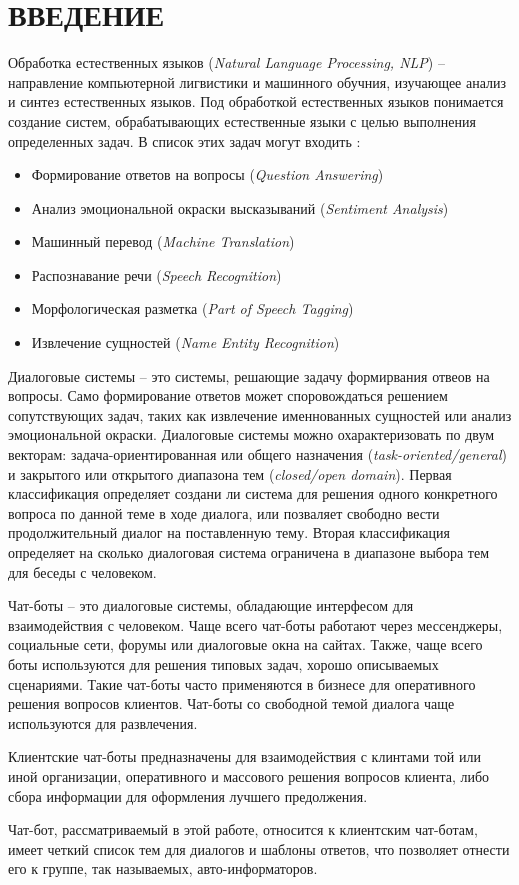 \section*{ВВЕДЕНИЕ}
Обработка естественных языков (\textit{Natural Language Processing, NLP})
-- направление компьютерной лигвистики и машинного обучния,
изучающее анализ и синтез естественных языков.
Под обработкой естественных языков  понимается создание систем,
обрабатывающих естественные языки с целью выполнения определенных задач.
В список этих задач могут входить \cite{cursera.nlp}:
\begin{itemize}
    \item Формирование ответов на вопросы (\textit{Question Answering})
    \item Анализ эмоциональной окраски высказываний (\textit{Sentiment Analysis})
    \item Машинный перевод (\textit{Machine Translation})
    \item Распознавание речи (\textit{Speech Recognition})
    \item Морфологическая разметка (\textit{Part of Speech Tagging})
    \item Извлечение сущностей (\textit{Name Entity Recognition})
\end{itemize}

Диалоговые системы -- это системы, решающие задачу формирвания отвеов на вопросы.
Само формирование ответов может споровождаться решением сопутствующих задач, таких как
извлечение именнованных сущностей или анализ эмоциональной окраски.
Диалоговые системы можно охарактеризовать по двум векторам:
задача-ориентированная или общего назначения (\textit{task-oriented/general})
и закрытого или открытого диапазона тем (\textit{closed/open domain}).
Первая классификация определяет создани ли система для решения одного конкретного
вопроса по данной теме в ходе диалога, или позваляет свободно вести продолжительный
диалог на поставленную тему.
Вторая классификация определяет на сколько диалоговая система ограничена в диапазоне выбора тем
для беседы с человеком.

Чат-боты -- это диалоговые системы, обладающие интерфесом для взаимодействия с человеком.
Чаще всего чат-боты работают через мессенджеры, социальные сети, форумы или диалоговые окна на сайтах.
Также, чаще всего боты используются для решения типовых задач, хорошо описываемых сценариями.
Такие чат-боты часто применяются в бизнесе для оперативного решения вопросов клиентов.
Чат-боты со свободной темой диалога чаще используются для развлечения.

Клиентские чат-боты предназначены для взаимодействия с клинтами той или иной организации,
оперативного и массового решения вопросов клиента, либо сбора информации
для оформления лучшего предолжения.

Чат-бот, рассматриваемый в этой работе, относится к клиентским чат-ботам,
имеет четкий список тем для диалогов и шаблоны ответов, что позволяет отнести
его к группе, так называемых, авто-информаторов.
